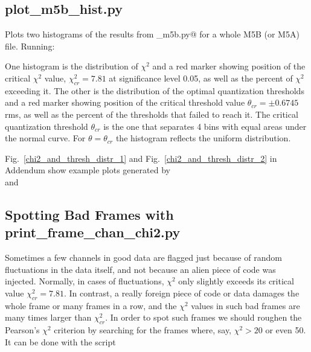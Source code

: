\documentclass[letterpaper,twoside,12pt]{article}
\begin{document}
\subsection{plot\_m5b\_hist.py}

Plots two histograms of the results from \verb@gpu_m5b.py@ for a whole M5B (or M5A) file.  Running: \\

\noindent \verb@%run plot_m5b_hist.py <M5B file name> <timestamp> @ \\

One histogram is the distribution of $\chi^2$ and a red marker showing position of the critical $\chi^2$ value,  $\chi^2_{cr} = 7.81$ at significance level 0.05, as well as the percent of $\chi^2$ exceeding it. The other is the distribution of the optimal quantization thresholds and a red marker showing position of the critical threshold value $\theta_{cr} = \pm 0.6745$ rms, as well as the percent of the thresholds that failed to reach it. The critical quantization threshold $\theta_{cr}$ is the one that separates 4 bins with equal areas under the normal curve. For $\theta = \theta_{cr}$ the histogram reflects the uniform distribution. 

Fig.~\ref{chi2_and_thresh_distr_1} and Fig.~\ref{chi2_and_thresh_distr_2} in Addendum show example plots generated by \\
\noindent \verb@%run plot_m5b_hist.py rd1903_ft_100-0950.m5b 025@ \\
\indent and \\
\noindent \verb@%run plot_m5b_hist.py rd1910_wz_268-1811.m5b 793@.


\subsection{Spotting Bad Frames with print\_frame\_chan\_chi2.py}

Sometimes a few channels in good data are flagged just because of random fluctuations in the data itself, and not because an alien piece of code was injected. Normally, in cases of fluctuations, $\chi^2$ only slightly exceeds its critical value $\chi^2_{cr} = 7.81$. In contrast, a really foreign piece of code or data damages the whole frame or many frames in a row, and the $\chi^2$ values in such bad frames are many times larger than $\chi^2_{cr}$. In order to spot such frames we should roughen the Pearson's $\chi^2$ criterion by searching for the frames where, say, $\chi^2 > 20$ or even 50. It can be done with the script \\
\end{document}
